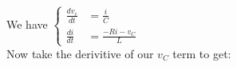 \documentclass[preview]{standalone}
\begin{document}
\begin{center}
We have \(\left\{
                    \begin{aligned}
                        \frac{dv_c}{dt} &= \frac{i}{C} \\
                        \frac{di}{dt} &= \frac{-Ri - v_C}{L}
                    \end{aligned}
                    \right.\) \\ Now take the derivitive of our $v_C$ term to get:
\end{center}
\end{document}
